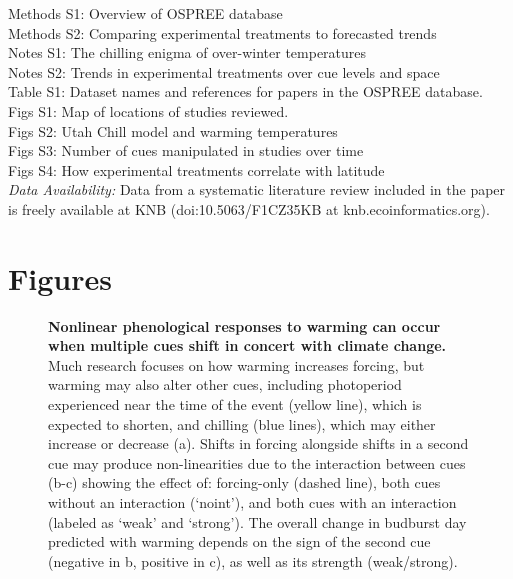 \documentclass[11pt,letter]{article}
\begin{document}
\clearpage
Methods S1: Overview of OSPREE database\\
Methods S2: Comparing experimental treatments to forecasted trends\\
Notes S1: The chilling enigma of over-winter temperatures\\
Notes S2: Trends in experimental treatments over cue levels and space\\
Table S1: Dataset names and references for papers in the OSPREE database.\\
Figs S1: Map of locations of studies reviewed.\\
Figs S2: Utah Chill model and warming temperatures\\
Figs S3: Number of cues manipulated in studies over time\\
Figs S4: How experimental treatments correlate with latitude
\vspace{2ex}\\

\emph{Data Availability:} Data from a systematic literature review included in the paper is freely available at KNB (doi:10.5063/F1CZ35KB at knb.ecoinformatics.org).\\


\section{Figures}
\clearpage

\begin{figure}
\centering
\caption{{\bf Nonlinear phenological responses to warming can occur when multiple cues shift in concert with climate change.} Much research focuses on how warming increases forcing, but warming may also alter other cues, including photoperiod experienced near the time of the event (yellow line), which is expected to shorten, and chilling (blue lines), which may either increase or decrease (a). Shifts in forcing alongside shifts in a second cue may produce non-linearities due to the interaction between cues (b-c) showing the effect of: forcing-only (dashed line), both cues without an interaction (`noint'), and both cues with an interaction (labeled as `weak' and `strong'). The overall change in budburst day predicted with warming depends on the sign of the second cue (negative in b, positive in c), as well as its strength (weak/strong).}
  \label{fig:intxncues}
\end{figure}
\end{document}
